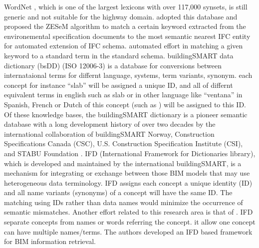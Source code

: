 \documentclass[Journal,InsideFigs, DoubleSpace]{ascelike} %
\begin{document}
WordNet \cite{miller95}, which is one of the largest lexicons with over 117,000 synsets, is still generic and not suitable for the highway domain.  adopted this database and proposed the ZESeM algorithm to match a certain keyword extracted from the environemental specification documents to the most semantic nearest IFC entity for automated extension of IFC schema. automated effort in matching a given keyword to a standard term in the standard schema. 
buildingSMART data dictionary (bsDD) (ISO 12006-3) \cite{buildingsmartData} is a database for conversions between internataional terms for differnt language, systems, term variants, synonym. each concept for instance ``slab'' will be assigned a unique ID, and all of differnt equivalent terms in english such as slab or in other language like ``ventana'' in Spanish, French or Dutch of this concept (such as ) will be assigned to this ID. Of these knowledge bases, the buildingSMART dictionary is a pioneer semantic database with a long development history of over two decades by the international collaboration of buildingSMART Norway, Construction Specifications Canada (CSC), U.S. Construction Specification Institute (CSI), and STABU Foundation \cite{hezik08}. IFD (International Framework for Dictionaries library), which is developed and maintained by the international buildingSMART, is a mechanism for integrating or exchange between those BIM models that may use heterogeneous data terminology. IFD assigns each concept a unique identity (ID) and all name variants (synonyms) of a concept will have the same ID. The matching using IDs rather than data names would minimize the occurrence of semantic mismatches. Another effort related to this research area is that of . IFD separate concepts from names or words referring the concept. it allow one concept can have multiple names/terms. The authors developed an IFD based framework for BIM information retrieval.
%
\end{document}
